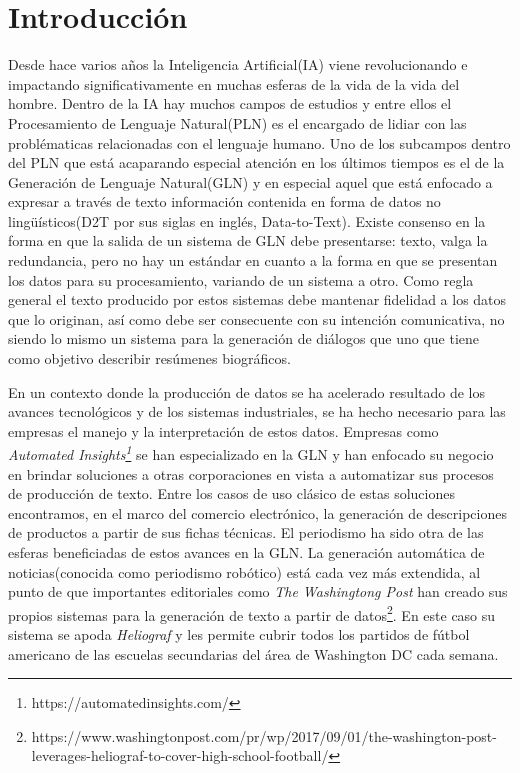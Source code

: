 \chapter*{Introducción}\label{chapter:introduction}

    Desde hace varios años la Inteligencia Artificial(IA) viene revolucionando e \\impactando significativamente en muchas esferas de la 
vida de la vida del hombre. Dentro de la IA hay muchos campos de estudios y entre ellos el  Procesamiento de Lenguaje Natural(PLN) es 
el encargado de lidiar con las problématicas relacionadas con el lenguaje humano. Uno de los subcampos dentro del PLN que está 
acaparando especial atención en los últimos tiempos es el de la Generación de Lenguaje Natural(GLN) y en especial aquel que está 
enfocado a expresar a través de texto información contenida en forma de datos no lingüísticos(D2T por sus siglas en inglés, Data-to-Text). 
Existe consenso en la forma en que la salida de un sistema de GLN debe presentarse: texto, valga la redundancia, pero no hay un est\'andar 
en cuanto a la forma en que se presentan los datos para su procesamiento, variando de un sistema a otro. Como regla general el 
texto producido por estos sistemas debe mantenar fidelidad a los datos que lo originan, así como debe ser consecuente con su intención 
comunicativa, no siendo lo mismo un sistema para la generación de diálogos que uno que tiene como objetivo describir resúmenes biográficos.

    En un contexto donde la producción de datos se ha acelerado resultado de los avances tecnológicos y de los sistemas industriales, se ha hecho necesario para 
las empresas el manejo y la interpretación de estos datos. Empresas como \\ \textit{Automated Insights\footnote[1]{https://automatedinsights.com/}} 
se han especializado en la GLN y han enfocado su negocio en brindar soluciones a otras corporaciones en vista a automatizar sus procesos de producción de texto. 
Entre los casos de uso clásico de estas soluciones encontramos, en el marco del comercio electr\'onico, la generación de descripciones de productos a partir de sus 
fichas técnicas. El periodismo ha sido otra de las esferas beneficiadas de estos avances en la GLN. La generación automática de noticias(conocida como periodismo robótico) 
está cada vez más extendida, al punto de que importantes editoriales como \textit{The Washingtong Post} han creado sus propios sistemas para la generación de texto a partir 
de datos\footnote[2]{https://www.washingtonpost.com/pr/wp/2017/09/01/the-washington-post-leverages-heliograf-to-cover-high-school-football/}. 
En este caso su sistema se apoda \textit{Heliograf} y les permite cubrir todos los partidos de fútbol americano de las escuelas secundarias del área de Washington DC 
cada semana.

